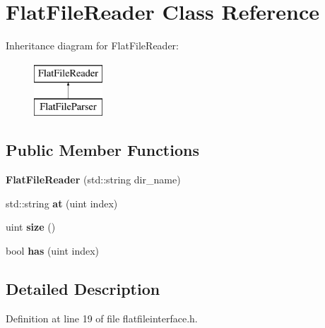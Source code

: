 \hypertarget{class_flat_file_reader}{}\section{Flat\+File\+Reader Class Reference}
\label{class_flat_file_reader}
Inheritance diagram for Flat\+File\+Reader\+:\begin{figure}[H]
\begin{center}
\leavevmode
\includegraphics[height=2.000000cm]{class_flat_file_reader}
\end{center}
\end{figure}
\subsection*{Public Member Functions}
\begin{DoxyCompactItemize}
\item 
{\bfseries Flat\+File\+Reader} (std\+::string dir\+\_\+name)\hypertarget{class_flat_file_reader_ae1c5000a285394231a542c2eabf09b85}{}\label{class_flat_file_reader_ae1c5000a285394231a542c2eabf09b85}

\item 
std\+::string {\bfseries at} (uint index)\hypertarget{class_flat_file_reader_aa743c454c716503a9b77368dced7d86c}{}\label{class_flat_file_reader_aa743c454c716503a9b77368dced7d86c}

\item 
uint {\bfseries size} ()\hypertarget{class_flat_file_reader_ae384eb0fdcbbf2b6e6a666761ad9767a}{}\label{class_flat_file_reader_ae384eb0fdcbbf2b6e6a666761ad9767a}

\item 
bool {\bfseries has} (uint index)\hypertarget{class_flat_file_reader_ad0c541a53501a7310ff1294c815c3e29}{}\label{class_flat_file_reader_ad0c541a53501a7310ff1294c815c3e29}

\end{DoxyCompactItemize}


\subsection{Detailed Description}


Definition at line 19 of file flatfileinterface.\+h.

